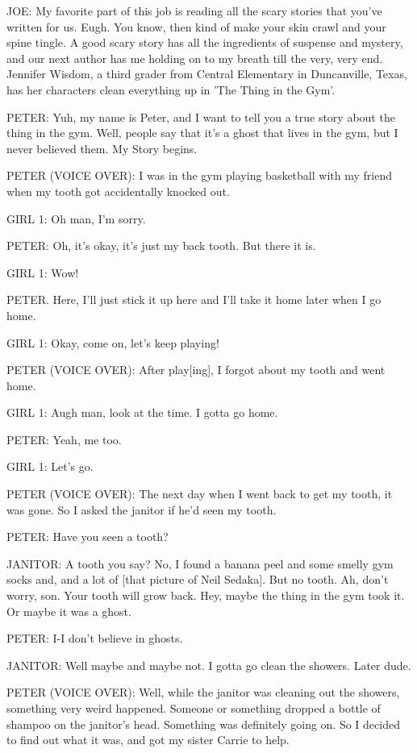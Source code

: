 JOE:
My favorite part of this job is reading all the scary stories that you've written for us.
Eugh.
You know, then kind of make your skin crawl and your spine tingle.
A good scary story has all the ingredients of suspense and mystery, and our next author has me holding on to my breath till the very, very end.
Jennifer Wisdom, a third grader from Central Elementary in Duncanville, Texas, has her characters clean everything up in 'The Thing in the Gym'.

PETER:
Yuh, my name is Peter, and I want to tell you a true story about the thing in the gym.
Well, people say that it's a ghost that lives in the gym, but I never believed them.
My Story begins.

PETER (VOICE OVER):
I was in the gym playing basketball with my friend when my tooth got accidentally knocked out.

GIRL 1:
Oh man, I'm sorry.

PETER:
Oh, it's okay, it's just my back tooth.
But there it is.

GIRL 1:
Wow!

PETER.
Here, I'll just stick it up here and I'll take it home later when I go home.

GIRL 1:
Okay, come on, let's keep playing!

PETER (VOICE OVER):
After play[ing], I forgot about my tooth and went home.

GIRL 1:
Augh man, look at the time.
I gotta go home.

PETER:
Yeah, me too.

GIRL 1:
Let's go.

PETER (VOICE OVER):
The next day when I went back to get my tooth, it was gone.
So I asked the janitor if he'd seen my tooth.

PETER:
Have you seen a tooth?

JANITOR:
A tooth you say?
No, I found a banana peel and some smelly gym socks and, and a lot of [that picture of Neil Sedaka].
But no tooth.
Ah, don't worry, son.
Your tooth will grow back.
Hey, maybe the thing in the gym took it.
Or maybe it was a ghost.

PETER:
I-I don't believe in ghosts.

JANITOR:
Well maybe and maybe not.
I gotta go clean the showers.
Later dude.

PETER (VOICE OVER):
Well, while the janitor was cleaning out the showers, something very weird happened.
Someone or something dropped a bottle of shampoo on the janitor's head.
Something was definitely going on.
So I decided to find out what it was, and got my sister Carrie to help.

